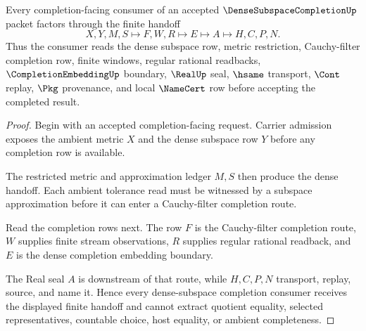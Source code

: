 \begin{theorem}
\label{thm:dense-subspace-completion-dense-handoff}
Every completion-facing consumer of an accepted $\DenseSubspaceCompletionUp$ packet factors through the finite handoff
$$
X,Y,M,S \longmapsto F,W,R \longmapsto E \longmapsto A \longmapsto H,C,P,N .
$$
Thus the consumer reads the dense subspace row, metric restriction, Cauchy-filter completion row, finite windows, regular rational readbacks, $\CompletionEmbeddingUp$ boundary, $\RealUp$ seal, $\hsame$ transport, $\Cont$ replay, $\Pkg$ provenance, and local $\NameCert$ row before accepting the completed result.
\end{theorem}
\begin{proof}
Begin with an accepted completion-facing request. Carrier admission exposes the ambient metric $X$ and the dense subspace row $Y$ before any completion row is available.

The restricted metric and approximation ledger $M,S$ then produce the dense handoff. Each ambient tolerance read must be witnessed by a subspace approximation before it can enter a Cauchy-filter completion route.

Read the completion rows next. The row $F$ is the Cauchy-filter completion route, $W$ supplies finite stream observations, $R$ supplies regular rational readback, and $E$ is the dense completion embedding boundary.

The Real seal $A$ is downstream of that route, while $H,C,P,N$ transport, replay, source, and name it. Hence every dense-subspace completion consumer receives the displayed finite handoff and cannot extract quotient equality, selected representatives, countable choice, host equality, or ambient completeness.
\end{proof}




